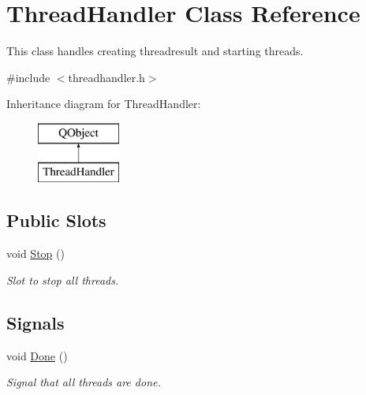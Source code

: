 \hypertarget{class_thread_handler}{\section{Thread\-Handler Class Reference}
\label{class_thread_handler}
}


This class handles creating threadresult and starting threads.  




{\ttfamily \#include $<$threadhandler.\-h$>$}

Inheritance diagram for Thread\-Handler\-:\begin{figure}[H]
\begin{center}
\leavevmode
\includegraphics[height=2.000000cm]{class_thread_handler}
\end{center}
\end{figure}
\subsection*{Public Slots}
\begin{DoxyCompactItemize}
\item 
void \hyperlink{class_thread_handler_af38507b6aa74ecbf6b13a7a3ea164be9}{Stop} ()
\begin{DoxyCompactList}\small\item\em Slot to stop all threads. \end{DoxyCompactList}\end{DoxyCompactItemize}
\subsection*{Signals}
\begin{DoxyCompactItemize}
\item 
void \hyperlink{class_thread_handler_a12c6ff2d09143f2d0b72bd76a900a77f}{Done} ()
\begin{DoxyCompactList}\small\item\em Signal that all threads are done. \end{DoxyCompactList}\end{DoxyCompactItemize}
